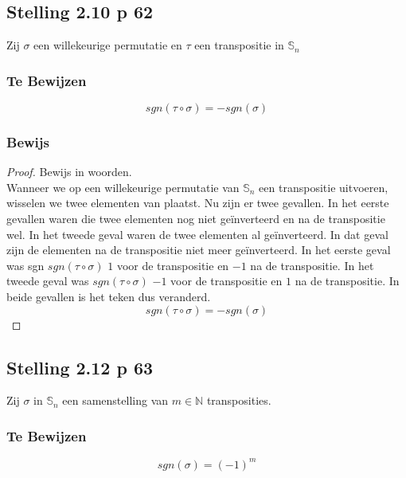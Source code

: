 \documentclass[lineaire_algebra_oplossingen.tex]{subfiles}
\begin{document}
\subsection{Stelling 2.10 p 62}
Zij $\sigma$ een willekeurige permutatie en $\tau$ een transpositie in $\mathbb{S}_n$
\subsubsection*{Te Bewijzen}
\[
sgn(\tau \circ \sigma) = - sgn(\sigma)
\]
\subsubsection*{Bewijs}
\begin{proof}
Bewijs in woorden.\\
Wanneer we op een willekeurige permutatie van $\mathbb{S}_n$ een transpositie uitvoeren, wisselen we twee elementen van plaatst. Nu zijn er twee gevallen. In het eerste gevallen waren die twee elementen nog niet ge\"inverteerd en na de transpositie wel. In het tweede geval waren de twee elementen al ge\"inverteerd. In dat geval zijn de elementen na de transpositie niet meer ge\"inverteerd. In het eerste geval was sgn $sgn(\tau \circ \sigma)$ $1$ voor de transpositie en $-1$ na de transpositie. In het tweede geval was $sgn(\tau \circ \sigma)$ $-1$ voor de transpositie en $1$ na de transpositie. In beide gevallen is het teken dus veranderd.
\[
sgn(\tau \circ \sigma) = - sgn(\sigma)
\]
\end{proof}

\subsection{Stelling 2.12 p 63}
Zij $\sigma$ in $\mathbb{S}_n$ een samenstelling van $m \in \mathbb{N}$ transposities.
\subsubsection*{Te Bewijzen}
\[
sgn(\sigma) = (-1)^{m}
\]
\end{document}
